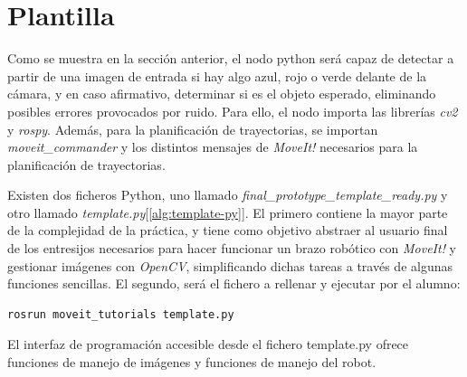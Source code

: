 \documentclass[12pt,spanish,chapterprefix, numbers=noenddot]{book}
\numberwithin{equation}{section}
\numberwithin{figure}{section}
\begin{document}
\section{Plantilla}
Como se muestra en la sección anterior, el nodo python será capaz de detectar a partir de una imagen de entrada si hay algo azul, rojo o verde delante de la cámara, y en caso afirmativo, determinar si es el objeto esperado, eliminando posibles errores provocados por ruido. 
Para ello, el nodo importa las librerías \textit{cv2} y \textit{rospy}. Además, para la planificación de trayectorias, se importan \textit{moveit\_commander} y los distintos mensajes de \textit{MoveIt!} necesarios para la planificación de trayectorias.

Existen dos ficheros Python, uno llamado \textit{final\_prototype\_template\_ready.py} y otro llamado \textit{template.py}[\ref{alg:template-py}]. 
El primero contiene la mayor parte de la complejidad de la práctica, y tiene como objetivo abstraer al usuario final de los entresijos necesarios para hacer funcionar un brazo robótico con \textit{MoveIt!} y gestionar imágenes con \textit{OpenCV}, simplificando dichas tareas a través de algunas funciones sencillas. El segundo, será el fichero a rellenar y ejecutar por el alumno: 
\vspace{20pt}
	\begin{lstlisting}[frame=single]
    rosrun moveit_tutorials template.py
    \end{lstlisting}
    
El interfaz de programación accesible desde el fichero template.py ofrece funciones de manejo de imágenes y funciones de manejo del robot. 
\end{document}
